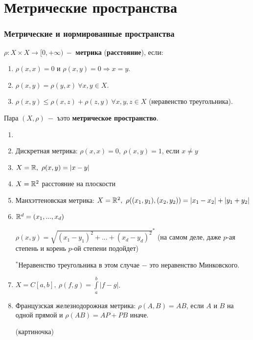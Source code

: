\part{Метрические пространства}
\section{Метрические и нормированные пространства}

\begin{definition}
    \item $\rho:X\times X\rightarrow [0,+\infty)\ -$ \textbf{метрика} (\textbf{расстояние}), если:
    \begin{enumerate}
        \item $\rho(x,x)=0$ и $\rho(x,y)=0\Rightarrow x=y$.
        \item $\rho(x,y)=\rho(y,x)\ \forall x,y\in X$.
        \item $\rho(x,y)\leq \rho(x,z) + \rho(z,y)\ \forall x,y,z\in X$ (неравенство треугольника).
    \end{enumerate}
\end{definition}

\begin{definition}
    Пара $(X,\rho)\ -$
    ъэто \textbf{метрическое пространство}.
\end{definition}

\begin{example}
    \begin{enumerate}
        \item[]
        \item Дискретная метрика: $\rho(x,x)=0,\ \rho(x,y)=1$, если $x\neq y$
        \item $X=\R,\ \rho(x,y)=|x-y|$
        \item $X=\mathbb{R}^2$ расстояние на плоскости
        \item Манхэттеновская метрика: $X=\R^2,\ \rho((x_1, y_1), (x_2, y_2))=|x_1-x_2|+|y_1+y_2|$
        \item $\mathbb{R}^d=(x_1,...,x_d)$

        $\rho(x,y)=\sqrt{(x_1-y_1)^2+...+(x_d-y_d)^2}^*$ (на самом деле, даже $p$-ая степень и корень $p$-ой степени подойдет)

        $^*$Неравенство треугольника в этом случае $-$ это неравенство Минковского.
        \item $X=C[a,b],\ \rho(f,g)=\int\limits_a^b |f-g|$.
        \item Французская железнодорожная метрика: $\rho(A,B)=AB$, если $A$ и $B$ на одной прямой и $\rho(AB)=AP+PB$ иначе.

        (картиночка)
    \end{enumerate}
\end{example}

